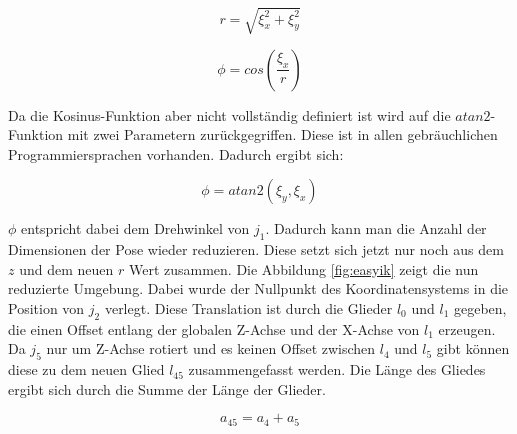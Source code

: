 \begin{equation}
r = \sqrt{\xi_x^2 + \xi_y^2}
\label{eq:5}
\end{equation}

\begin{equation}
\phi = cos(\dfrac{\xi_x}{r})
\label{eq:6}
\end{equation}

Da die Kosinus-Funktion aber nicht vollständig definiert ist wird auf die $atan2$-Funktion mit zwei Parametern zurückgegriffen. Diese ist in allen gebräuchlichen Programmiersprachen vorhanden. Dadurch ergibt sich:

\begin{equation}
\phi = atan2(\xi_y,\xi_x)
\label{eq:7}
\end{equation}

$\phi$ entspricht dabei dem Drehwinkel von $j_1$. Dadurch kann man die Anzahl der Dimensionen der Pose wieder reduzieren. Diese setzt sich jetzt nur noch aus dem $z$ und dem neuen $r$ Wert zusammen. Die Abbildung \ref{fig:easyik} zeigt die nun reduzierte Umgebung. Dabei wurde der Nullpunkt des Koordinatensystems in die Position von $j_2$ verlegt. Diese Translation ist durch die Glieder $l_0$ und $l_1$ gegeben, die einen Offset entlang der globalen Z-Achse und der X-Achse von $l_1$ erzeugen. Da $j_5$ nur um Z-Achse rotiert und es keinen Offset zwischen $l_4$ und $l_5$ gibt können diese zu dem neuen Glied $l_{45}$ zusammengefasst werden. Die Länge des Gliedes ergibt sich durch die Summe der Länge der Glieder.

\begin{equation}
a_{45} = a_{4} +a_{5}
\label{eq:8}
\end{equation}

